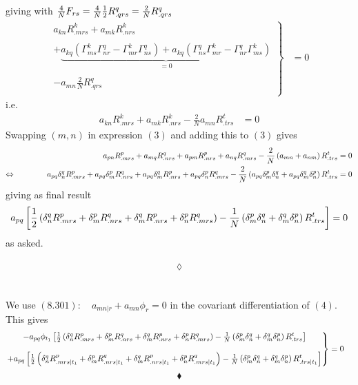 giving with $\frac{4}{N}F_{rs} = \frac{4}{N}\frac{1}{2} R^q_{.qrs}=\frac{2}{N} R^q_{.qrs}$
\begin{align*}
\left.\begin{matrix}
a_{kn}R^k_{.mrs}+ a_{mk}R^k_{.nrs}\\\\
+ \underbrace{a_{kq}\left(\Gamma^k_{ms}\Gamma^q_{nr}  -\Gamma^k_{mr} \Gamma^q_{ns}\right) 
+ a_{kq}\left(\Gamma^q_{ns}\Gamma^k_{mr}- \Gamma^q_{nr}\Gamma^k_{ms}\right) }_{=0}\\\\
-a_{mn}\frac{2}{N}R^q_{.qrs}\\
\end{matrix}\right\}&=0
\end{align*}
i.e.
\begin{align}
a_{kn}R^k_{.mrs}+ a_{mk}R^k_{.nrs}-\frac{2}{N}a_{mn}R^t_{.trs}&=0
\end{align} 
Swapping $(m,n)$ in expression $(3)$ and adding this to $(3)$ gives
\begin{align*}
a_{pn}R^p_{.mrs}+ a_{mq}R^q_{.nrs}+a_{pm}R^p_{.nrs}+ a_{nq}R^q_{.mrs}-\frac{2}{N}\left(a_{mn}+a_{nm}\right)R^t_{.trs}&=0\\
\Leftrightarrow\quad\quad\quad\quad a_{pq}\delta^q_n R^p_{.mrs}+ a_{pq}\delta^p_mR^q_{.nrs}+a_{pq}\delta^q_mR^p_{.nrs}+ a_{pq}\delta^p_nR^q_{.mrs}-\frac{2}{N}\left(a_{pq}\delta^p_m\delta^q_n+a_{pq}\delta^q_m\delta^p_n\right)R^t_{.trs}&=0
\end{align*}
giving as final result
\begin{align}a_{pq}\left[\frac{1}{2}\left(\delta^q_n R^p_{.mrs}+\delta^p_mR^q_{.nrs}+\delta^q_mR^p_{.nrs}+\delta^p_nR^q_{.mrs}\right)-\frac{1}{N}\left(\delta^p_m\delta^q_n+\delta^q_m\delta^p_n\right)R^t_{.trs}\right]=0
\end{align}
as asked.\\\\

$$\lozenge$$\\\\
We use $\mathbf{(8.301)}:  \quad a_{mn|r}+ a_{mn}\phi_r=0$ in the  
covariant differentiation of $(4)$. \\
This  gives
\begin{align}
\left.\begin{matrix}
-a_{pq}\phi_{t_1}\left[\frac{1}{2}\left(\delta^q_n R^p_{.mrs}+\delta^p_mR^q_{.nrs}+\delta^q_mR^p_{.nrs}+\delta^p_nR^q_{.mrs}\right)-\frac{1}{N}\left(\delta^p_m\delta^q_n+\delta^q_m\delta^p_n\right)R^t_{.trs}\right]\\\\
+a_{pq}\left[\frac{1}{2}\left(\delta^q_n R^p_{.mrs|t_1}+\delta^p_mR^q_{.nrs|t_1}+\delta^q_mR^p_{.nrs|t_1}+\delta^p_nR^q_{.mrs|t_1}\right)-\frac{1}{N}\left(\delta^p_m\delta^q_n+\delta^q_m\delta^p_n\right)R^t_{.trs|t_1}\right]
\end{matrix}\right\}&=0
\end{align}
$$\blacklozenge$$
\newpage





